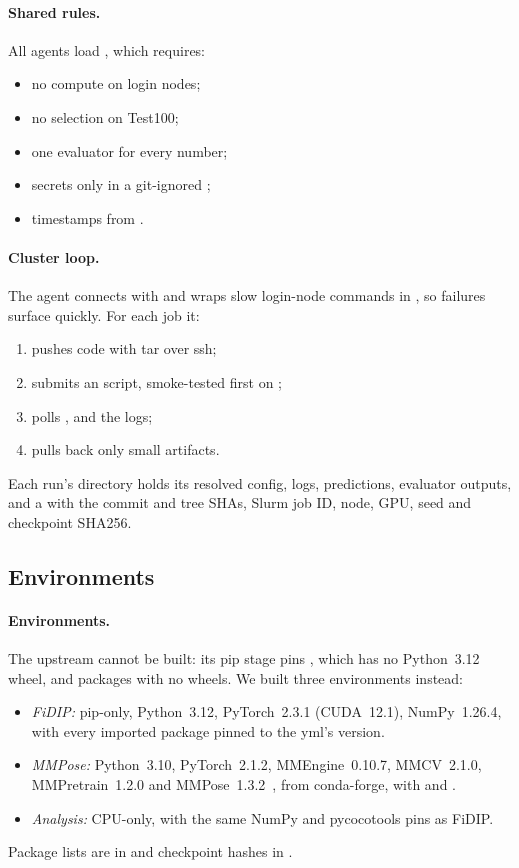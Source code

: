 \paragraph{Shared rules.} All agents load , which requires:
\begin{itemize}[leftmargin=*]
  \item no compute on login nodes;
  \item no selection on Test100;
  \item one evaluator for every number;
  \item secrets only in a git-ignored ;
  \item timestamps from .
\end{itemize}

\paragraph{Cluster loop.} The agent connects with  and wraps slow login-node commands in , so failures surface quickly. For each job it:
\begin{enumerate}[leftmargin=*]
  \item pushes code with tar over ssh;
  \item submits an  script, smoke-tested first on ;
  \item polls ,  and the logs;
  \item pulls back only small artifacts.
\end{enumerate}
Each run's directory  holds its resolved config, logs, predictions, evaluator outputs, and a  with the commit and tree SHAs, Slurm job ID, node, GPU, seed and checkpoint SHA256.


\subsection{Environments}\label{app:env}

\paragraph{Environments.} The upstream  cannot be built: its pip stage pins , which has no Python~3.12 wheel, and  packages with no wheels. We built three environments instead:
\begin{itemize}[leftmargin=*]
  \item \emph{FiDIP:} pip-only, Python~3.12, PyTorch~2.3.1 (CUDA~12.1), NumPy~1.26.4, with every imported package pinned to the yml's version.
  \item \emph{MMPose:} Python~3.10, PyTorch~2.1.2, MMEngine~0.10.7, MMCV~2.1.0, MMPretrain~1.2.0 and MMPose~1.3.2~\citep{mmpose2020}, from conda-forge, with  and .
  \item \emph{Analysis:} CPU-only, with the same NumPy and pycocotools pins as FiDIP.
\end{itemize}
Package lists are in  and checkpoint hashes in .

